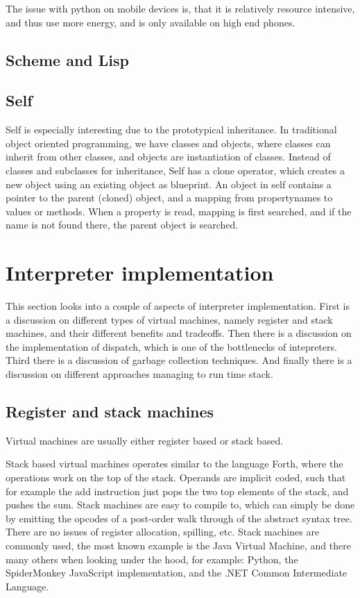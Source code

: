 \documentclass[11pt]{report}
\begin{document}
The issue with python on mobile devices is, that it is relatively resource intensive, and thus use more energy, and is only available on high end phones.

\subsection{Scheme and Lisp}

\subsection{Self}
\label{survey-self}
Self \cite{self} is especially interesting due to the prototypical inheritance.
In traditional object oriented programming, we have classes and objects, where classes can inherit from other classes, and objects are instantiation of classes.
Instead of classes and subclasses for inheritance, Self has a clone operator, which creates a new object using an existing object as blueprint.
An object in self contains a pointer to the parent (cloned) object, and a mapping from propertynames to values or methods. When a property is read, mapping is first searched, and if the name is not found there, the parent object is searched.

\section{Interpreter implementation}
\label{interpreter-implementation}
This section looks into a couple of aspects of interpreter implementation.
First is a discussion on different types of virtual machines, namely register and stack machines, and their different benefits and tradeoffs.
Then there is a discussion on the implementation of dispatch, which is one of the bottlenecks of intepreters.
Third there is a discussion of garbage collection techniques.
And finally there is a discussion on different approaches managing to run time stack.

\subsection{Register and stack machines}
Virtual machines are usually either register based or stack based.

Stack based virtual machines operates similar to the language Forth, where the operations work on the top of the stack. 
Operands are implicit coded, such that for example the add instruction just pops the two top elements of the stack, and pushes the sum. 
Stack machines are easy to compile to, 
which can simply be done by emitting the opcodes of a post-order walk through of the abstract syntax tree. 
There are no issues of register allocation, spilling, etc.
Stack machines are commonly used, the most known example is the Java Virtual Machine, and there many others when looking under the hood, for example: Python, the SpiderMonkey JavaScript implementation, and the .NET Common Intermediate Language.
\end{document}
